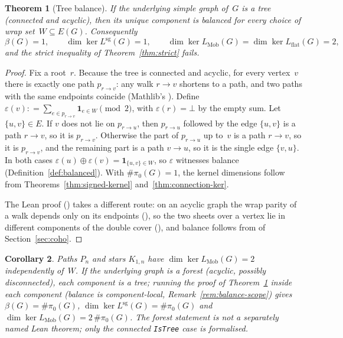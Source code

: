 \documentclass[11pt,a4paper]{amsart}
\theoremstyle{plain}
\newtheorem{theorem}{Theorem}[section]
\newtheorem{corollary}[theorem]{Corollary}
\theoremstyle{definition}
\theoremstyle{remark}
\DeclareMathOperator{\Ker}{ker}
\newcommand{\Lsigned}{L^{\operatorname{sg}}}
\newcommand{\comp}{\pi_0}
\newcommand{\defeq}{\mathrel{\mathop:}=}
\begin{document}
\begin{theorem}[Tree balance]\label{thm:tree-balanced}
If the underlying simple graph of~$G$ is a tree (connected and
acyclic), then its unique component is balanced for \emph{every}
choice of wrap set~$W\subseteq E(G)$. Consequently
\[
  \beta(G) = 1, \qquad
  \dim\Ker \Lsigned(G) = 1, \qquad
  \dim\Ker L_{\mathrm{Mob}}(G) = \dim\Ker L_{\mathrm{flat}}(G) = 2,
\]
and the strict inequality of Theorem~\ref{thm:strict} fails.
\end{theorem}

\begin{proof}
Fix a root~$r$. Because the tree is connected and acyclic, for every
vertex~$v$ there is exactly one path $p_{r\to v}$: any walk $r\to v$
shortens to a path, and two paths with the same endpoints coincide
(Mathlib's ). Define
$\varepsilon(v)\defeq \sum_{e\in p_{r\to v}} \mathbf{1}_{e\in W}
  \pmod 2$, with $\varepsilon(r)=\bot$ by the empty sum. Let
$\{u,v\}\in E$. If $v$ does not lie on $p_{r\to u}$, then $p_{r\to u}$
followed by the edge $\{u,v\}$ is a path $r\to v$, so it is
$p_{r\to v}$. Otherwise the part of $p_{r\to u}$ up to~$v$ is a path
$r\to v$, so it is $p_{r\to v}$, and the remaining part is a path
$v\to u$, so it is the single edge $\{v,u\}$. In both cases
$\varepsilon(u)\oplus\varepsilon(v)=\mathbf{1}_{\{u,v\}\in W}$, so
$\varepsilon$ witnesses balance (Definition~\ref{def:balanced}). With
$\#\comp(G)=1$, the kernel dimensions follow from
Theorems~\ref{thm:signed-kernel} and~\ref{thm:connection-ker}.

The Lean proof () takes a different route: on
an acyclic graph the wrap parity of a walk depends only on its
endpoints (), so the two sheets
over a vertex lie in different components of the double cover
(), and balance follows from
 of Section~\ref{sec:coho}.
\end{proof}

\begin{corollary}\label{cor:forest-star-path}
Paths $P_n$ and stars $K_{1,n}$ have
$\dim\Ker L_{\mathrm{Mob}}(G)=2$ independently of~$W$. If the
underlying graph is a forest (acyclic, possibly disconnected), each
component is a tree; running the proof of
Theorem~\ref{thm:tree-balanced} inside each component (balance is
component-local, Remark~\ref{rem:balance-scope}) gives
$\beta(G)=\#\comp(G)$, $\dim\Ker\Lsigned(G)=\#\comp(G)$ and
$\dim\Ker L_{\mathrm{Mob}}(G)=2\,\#\comp(G)$. The forest statement is
not a separately named Lean theorem; only the connected
\texttt{IsTree} case is formalised.
\end{corollary}
\end{document}

